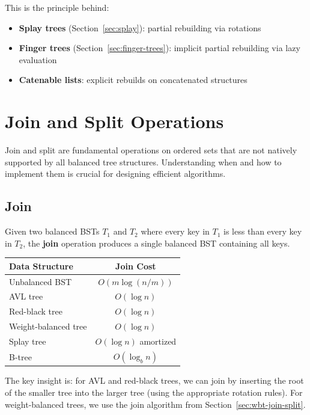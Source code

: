 This is the principle behind:
\begin{itemize}
    \item \textbf{Splay trees} (Section~\ref{sec:splay}): partial rebuilding via rotations
    \item \textbf{Finger trees} (Section~\ref{sec:finger-trees}): implicit partial rebuilding via lazy evaluation
    \item \textbf{Catenable lists}: explicit rebuilds on concatenated structures
\end{itemize}

\section{Join and Split Operations}
\label{sec:join-split}

Join and split are fundamental operations on ordered sets that are not natively supported by all balanced tree structures. Understanding when and how to implement them is crucial for designing efficient algorithms.

\subsection{Join}
\label{sec:join-operation}

Given two balanced BSTs $T_1$ and $T_2$ where every key in $T_1$ is less than every key in $T_2$, the \textbf{join} operation produces a single balanced BST containing all keys.

\begin{center}
\begin{tabular}{lc}
\toprule
Data Structure & Join Cost \\
\midrule
Unbalanced BST & $O(m \log(n/m))$ \\
AVL tree & $O(\log n)$ \\
Red-black tree & $O(\log n)$ \\
Weight-balanced tree & $O(\log n)$ \\
Splay tree & $O(\log n)$ amortized \\
B-tree & $O(\log_b n)$ \\
\bottomrule
\end{tabular}
\end{center}

The key insight is: for AVL and red-black trees, we can join by inserting the root of the smaller tree into the larger tree (using the appropriate rotation rules). For weight-balanced trees, we use the join algorithm from Section~\ref{sec:wbt-join-split}.


